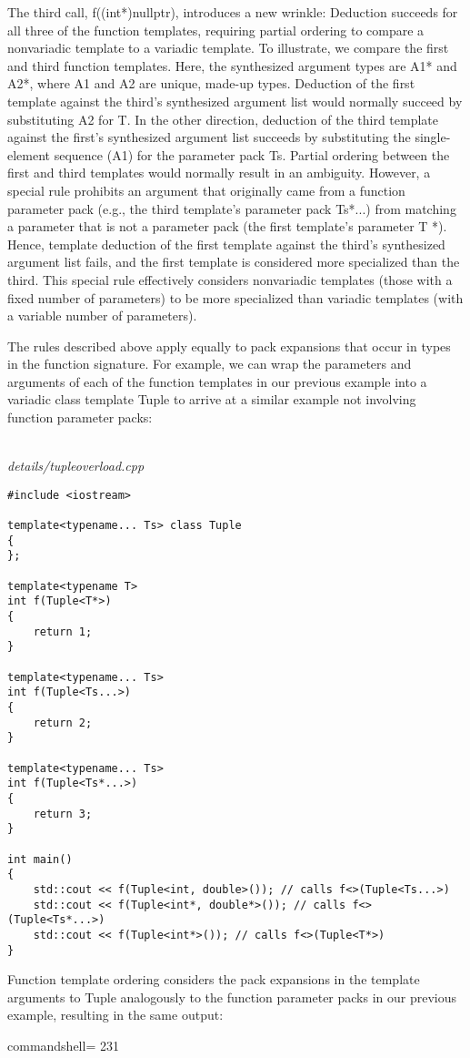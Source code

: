The third call, f((int*)nullptr), introduces a new wrinkle: Deduction succeeds for all three of the function templates, requiring partial ordering to compare a nonvariadic template to a variadic template. To illustrate, we compare the first and third function templates. Here, the synthesized argument types are A1* and A2*, where A1 and A2 are unique, made-up types. Deduction of the first template against the third’s synthesized argument list would normally succeed by substituting A2 for T. In the other direction, deduction of the third template against the first’s synthesized argument list succeeds by substituting the single-element sequence (A1) for the parameter pack Ts. Partial ordering between the first and third templates would normally result in an ambiguity. However, a special rule prohibits an argument that originally came from a function parameter pack (e.g., the third template’s parameter pack Ts*...) from matching a parameter that is not a parameter pack (the first template’s parameter T *). Hence, template deduction of the first template against the third’s synthesized argument list fails, and the first template is considered more specialized than the third. This special rule effectively considers nonvariadic templates (those with a fixed number of parameters) to be more specialized than variadic templates (with a variable number of parameters).

The rules described above apply equally to pack expansions that occur in types in the function signature. For example, we can wrap the parameters and arguments of each of the function templates in our previous example into a variadic class template Tuple to arrive at a similar example not involving function parameter packs:

\hspace*{\fill} \\ %
\noindent
\textit{details/tupleoverload.cpp}
\begin{lstlisting}[style=styleCXX]
#include <iostream>

template<typename... Ts> class Tuple
{
};

template<typename T>
int f(Tuple<T*>)
{
	return 1;
}

template<typename... Ts>
int f(Tuple<Ts...>)
{
	return 2;
}

template<typename... Ts>
int f(Tuple<Ts*...>)
{
	return 3;
}

int main()
{
	std::cout << f(Tuple<int, double>()); // calls f<>(Tuple<Ts...>)
	std::cout << f(Tuple<int*, double*>()); // calls f<>(Tuple<Ts*...>)
	std::cout << f(Tuple<int*>()); // calls f<>(Tuple<T*>)
}
\end{lstlisting}

Function template ordering considers the pack expansions in the template arguments to Tuple analogously to the function parameter packs in our previous example, resulting in the same output:

\begin{tcblisting}{commandshell={}}
231
\end{tcblisting}





















